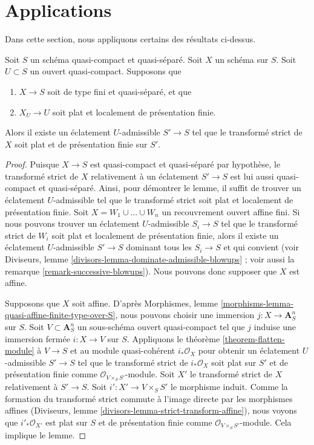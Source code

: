\section{Applications}
\label{section-applications}

\noindent
Dans cette section, nous appliquons certains des résultats ci-dessus.

\begin{lemma}
\label{lemma-flat-after-blowing-up}
Soit $S$ un schéma quasi-compact et quasi-séparé.
Soit $X$ un schéma sur $S$.
Soit $U \subset S$ un ouvert quasi-compact.
Supposons que
\begin{enumerate}
\item $X \to S$ soit de type fini et quasi-séparé, et que
\item $X_U \to U$ soit plat et localement de présentation finie.
\end{enumerate}
Alors il existe un éclatement $U$-admissible $S' \to S$ tel que
le transformé strict de $X$ soit plat et de présentation finie
sur $S'$.
\end{lemma}

\begin{proof}
Puisque $X \to S$ est quasi-compact et quasi-séparé par hypothèse,
le transformé strict de $X$ relativement à un éclatement $S' \to S$
est lui aussi quasi-compact et quasi-séparé. Ainsi, pour démontrer le lemme,
il suffit de trouver un éclatement $U$-admissible tel que le transformé
strict soit plat et localement de présentation finie.
Soit $X = W_1 \cup \ldots \cup W_n$ un recouvrement ouvert affine fini.
Si nous pouvons trouver un éclatement $U$-admissible $S_i \to S$ tel que le
transformé strict de $W_i$ soit plat et localement de présentation finie,
alors il existe un éclatement $U$-admissible $S' \to S$ dominant
tous les $S_i \to S$ et qui convient (voir
Diviseurs, lemme \ref{divisors-lemma-dominate-admissible-blowups} ;
voir aussi la remarque \ref{remark-successive-blowups}).
Nous pouvons donc supposer que $X$ est affine.

\medskip\noindent
Supposons que $X$ soit affine. D'après
Morphismes, lemme \ref{morphisms-lemma-quasi-affine-finite-type-over-S},
nous pouvons choisir une immersion $j : X \to \mathbf{A}^n_S$ sur $S$.
Soit $V \subset \mathbf{A}^n_S$ un sous-schéma ouvert quasi-compact
tel que $j$ induise une immersion fermée $i : X \to V$ sur $S$. Appliquons
le théorème \ref{theorem-flatten-module}
à $V \to S$ et au module quasi-cohérent $i_*\mathcal{O}_X$
pour obtenir un éclatement $U$-admissible $S' \to S$ tel que le transformé
strict de $i_*\mathcal{O}_X$ soit plat sur $S'$ et de présentation finie
comme $\mathcal{O}_{V \times_S S'}$-module. Soit $X'$ le transformé strict
de $X$ relativement à $S' \to S$. Soit $i' : X' \to V \times_S S'$
le morphisme induit.
Comme la formation du transformé strict commute à l'image directe par les
morphismes affines (Diviseurs, lemme \ref{divisors-lemma-strict-transform-affine}),
nous voyons que $i'_*\mathcal{O}_{X'}$ est plat sur $S$ et de
présentation finie comme $\mathcal{O}_{V \times_S S'}$-module.
Cela implique le lemme.
\end{proof}

